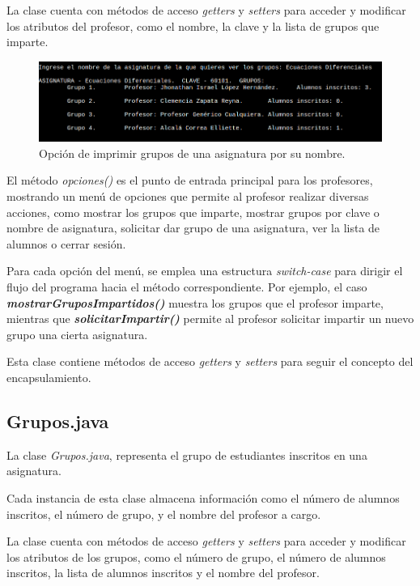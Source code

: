 \documentclass[a4paper,12pt]{article}
\begin{document}
La clase cuenta con métodos de acceso \textit{getters} y \textit{setters} para acceder y modificar los atributos del profesor, como el nombre, la clave y la lista de grupos que imparte.

\begin{figure}[ht]
    \centering
    \includegraphics[width=.9\textwidth]{media/grupos_por_nombre.png}
    \caption{Opción de imprimir grupos de una asignatura por su nombre.}
    \label{fig:gruposxnombre}
\end{figure}

El método \textit{opciones()} es el punto de entrada principal para los profesores, mostrando un menú de opciones que permite al profesor realizar diversas acciones, como mostrar los grupos que imparte, mostrar grupos por clave o nombre de asignatura, solicitar dar grupo de una asignatura, ver la lista de alumnos o cerrar sesión.

Para cada opción del menú, se emplea una estructura \textit{switch-case} para dirigir el flujo del programa hacia el método correspondiente. Por ejemplo, el caso \textbf{\textit{mostrarGruposImpartidos()}} muestra los grupos que el profesor imparte, mientras que \textbf{\textit{solicitarImpartir()}} permite al profesor solicitar impartir un nuevo grupo una cierta asignatura.

Esta clase contiene métodos de acceso \textit{getters} y \textit{setters} para seguir el concepto del encapsulamiento.

\subsection{Grupos.java}

La clase \textit{Grupos.java}, representa el grupo de estudiantes inscritos en una asignatura. 

Cada instancia de esta clase almacena información como el número de alumnos inscritos, el número de grupo, y el nombre del profesor a cargo.

La clase cuenta con métodos de acceso \textit{getters} y \textit{setters} para acceder y modificar los atributos de los grupos, como el número de grupo, el número de alumnos inscritos, la lista de alumnos inscritos y el nombre del profesor.
\end{document}
